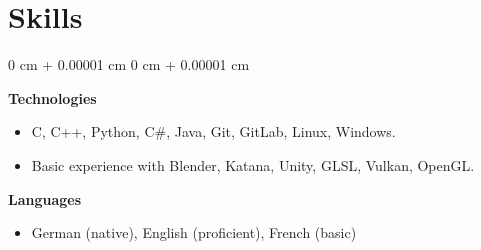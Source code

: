 \documentclass[10pt, letterpaper]{article}
\newenvironment{highlights}{
    \begin{itemize}[
        topsep=0.10 cm,
        parsep=0.10 cm,
        partopsep=0pt,
        itemsep=0pt,
        leftmargin=0 cm + 10pt
    ]
}{
    \end{itemize}
} %
\newenvironment{onecolentry}{
    \begin{adjustwidth}{
        0 cm + 0.00001 cm
    }{
        0 cm + 0.00001 cm
    }
}{
    \end{adjustwidth}
} %
\begin{document}
    \section{Skills}
    \sectspacetop
    \begin{onecolentry}
    \textbf{Technologies}
            \begin{highlights}
                \item C, C++, Python, C\#, Java, Git, GitLab, Linux, Windows.
                \item Basic experience with Blender, Katana, Unity, GLSL, Vulkan, OpenGL.
                \end{highlights}
                \expspace
                \textbf{Languages}
                \begin{highlights}
                \item German (native), English (proficient), French (basic)
            \end{highlights}
        \end{onecolentry}
    
\newcommand{\vspacepubl}{\expspace}    
\end{document}
